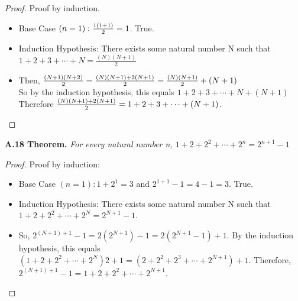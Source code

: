 \documentclass[12pt,leqno]{article}
\numberwithin{equation}{section}
\theoremstyle{definition}
\begin{document}
\begin{proof}[Proof]
Proof by induction.
\begin{itemize}
\item
Base Case $(n = 1): {1(1+1) \over 2} = 1$.  True.
\item
Induction Hypothesis:  There exists some natural number N such that $1+2+3+\cdots + N=\frac{(N)(N+1)}{2}$
\item
Then, ${(N+1)(N+2) \over 2}  = {(N)(N+1) + 2(N+1) \over 2} = {(N)(N+1) \over 2} + (N+1)$ \\
So by the induction hypothesis, this equals $1+2+3+\cdots + N + (N + 1)$\\
Therefore ${(N)(N+1) + 2(N+1) \over 2} = 1+2+3+\cdots + (N+1)$.

\end{itemize}
\end{proof}


\noindent \textbf{A.18 Theorem.} \emph{For every natural number n,  $1+2+2^2+\cdots + 2^n=2^{n+1}-1$}

\begin{proof}[Proof]
Proof by induction:
\begin{itemize}
\item
Base Case $(n = 1): 1 + 2^1 = 3$ and $2^{1+1}-1 = 4-1 = 3$.  True.
\item
Induction Hypothesis: There exists some natural number N such that $1+2+2^2+\cdots + 2^N=2^{N+1}-1$.
\item
So, $2^{(N+1)+1}-1 = 2(2^{N+1}) - 1 = 2(2^{N+1} - 1) + 1$. By the induction hypothesis, this equals $(1+2+2^2+\cdots + 2^N)2 + 1 = (2+2^2+2^3+\cdots + 2^{N+1}) + 1$.  Therefore, $2^{(N+1)+1}-1 = 1+2+2^2+\cdots + 2^{N+1}$.
\end{itemize}
\end{proof}
\end{document}

